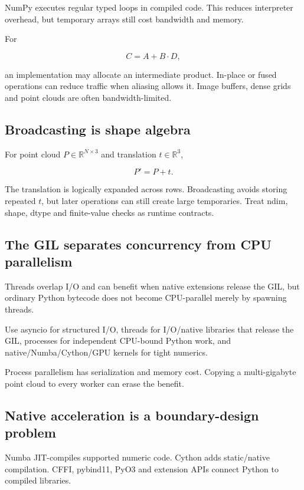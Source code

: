 NumPy executes regular typed loops in compiled code. This reduces interpreter overhead, but temporary arrays still cost bandwidth and memory.

For

\[
C=A+B\cdot D,
\]

an implementation may allocate an intermediate product. In-place or fused operations can reduce traffic when aliasing allows it. Image buffers, dense grids and point clouds are often bandwidth-limited.

\subsection{Broadcasting is shape algebra}\label{01-foundations-i-ch017-broadcasting-is-shape-algebra}

For point cloud \(P\in\mathbb R^{N\times3}\) and translation \(t\in\mathbb R^3\),

\[
P'=P+t.
\]

The translation is logically expanded across rows. Broadcasting avoids storing repeated \(t\), but later operations can still create large temporaries. Treat ndim, shape, dtype and finite-value checks as runtime contracts.

\subsection{The GIL separates concurrency from CPU parallelism}\label{01-foundations-i-ch017-the-gil-separates-concurrency-from-cpu-parallelism}

Threads overlap I/O and can benefit when native extensions release the GIL, but ordinary Python bytecode does not become CPU-parallel merely by spawning threads.

Use asyncio for structured I/O, threads for I/O/native libraries that release the GIL, processes for independent CPU-bound Python work, and native/Numba/Cython/GPU kernels for tight numerics.

Process parallelism has serialization and memory cost. Copying a multi-gigabyte point cloud to every worker can erase the benefit.

\subsection{Native acceleration is a boundary-design problem}\label{01-foundations-i-ch017-native-acceleration-is-a-boundary-design-problem}

Numba JIT-compiles supported numeric code. Cython adds static/native compilation. CFFI, pybind11, PyO3 and extension APIs connect Python to compiled libraries.

